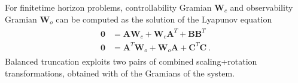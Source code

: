 \documentclass[letterpaper,10pt,english]{jupyterBook}
\begin{document}
\sphinxAtStartPar
For finite\sphinxhyphen{}time horizon problems, controllability Gramian \(\mathbf{W}_c\) and observability Gramian \(\mathbf{W}_o\) can be computed as the solution of the Lyapunov equation
\begin{equation*}
\begin{split}\begin{aligned}
 \mathbf{0} & = \mathbf{A} \mathbf{W}_c + \mathbf{W}_c \mathbf{A}^T + \mathbf{B} \mathbf{B}^T \\
 \mathbf{0} & = \mathbf{A}^T \mathbf{W}_o + \mathbf{W}_o \mathbf{A} + \mathbf{C}^T \mathbf{C} \ .
\end{aligned}\end{split}
\end{equation*}
\sphinxAtStartPar
Balanced truncation exploits two pairs of combined scaling+rotation transformations, obtained with {\hyperref[\detokenize{ch/linear-algebra/svd:math-svd}]{}} of the Gramians of the system.
\end{document}
